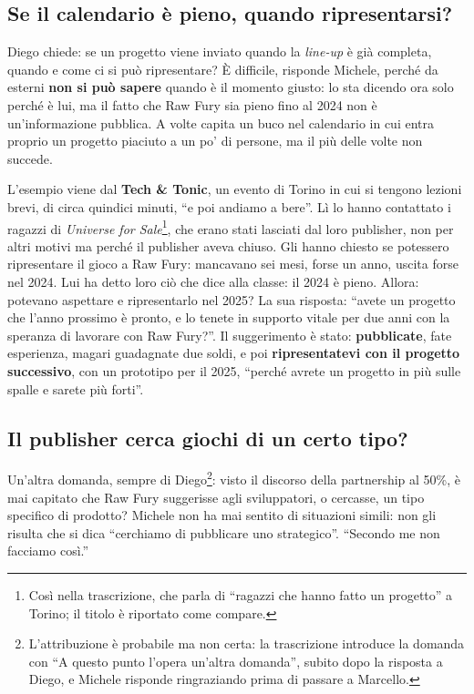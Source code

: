 \subsection{Se il calendario è pieno, quando ripresentarsi?}

Diego chiede: se un progetto viene inviato quando la \emph{line-up} è già
completa, quando e come ci si può ripresentare? È difficile, risponde Michele,
perché da esterni \textbf{non si può sapere} quando è il momento giusto: lo sta
dicendo ora solo perché è lui, ma il fatto che Raw Fury sia pieno fino al 2024
non è un'informazione pubblica. A volte capita un buco nel calendario in cui
entra proprio un progetto piaciuto a un po' di persone, ma il più delle volte non
succede.

L'esempio viene dal \textbf{Tech \& Tonic}, un evento di Torino in cui si tengono
lezioni brevi, di circa quindici minuti, ``e poi andiamo a bere''. Lì lo hanno
contattato i ragazzi di \emph{Universe for Sale}\footnote{Così nella
trascrizione, che parla di ``ragazzi che hanno fatto un progetto'' a Torino; il
titolo è riportato come compare.}, che erano stati lasciati dal loro publisher,
non per altri motivi ma perché il publisher aveva chiuso. Gli hanno chiesto se
potessero ripresentare il gioco a Raw Fury: mancavano sei mesi, forse un anno,
uscita forse nel 2024. Lui ha detto loro ciò che dice alla classe: il 2024 è
pieno. Allora: potevano aspettare e ripresentarlo nel 2025? La sua risposta:
``avete un progetto che l'anno prossimo è pronto, e lo tenete in supporto vitale
per due anni con la speranza di lavorare con Raw Fury?''. Il suggerimento è
stato: \textbf{pubblicate}, fate esperienza, magari guadagnate due soldi, e poi
\textbf{ripresentatevi con il progetto successivo}, con un prototipo per il
2025, ``perché avrete un progetto in più sulle spalle e sarete più forti''.

\subsection{Il publisher cerca giochi di un certo tipo?}

Un'altra domanda, sempre di Diego\footnote{L'attribuzione è probabile ma non
certa: la trascrizione introduce la domanda con ``A questo punto l'opera
un'altra domanda'', subito dopo la risposta a Diego, e Michele risponde
ringraziando prima di passare a Marcello.}: visto il discorso della partnership al
50\%, è mai capitato che Raw Fury suggerisse agli sviluppatori, o cercasse, un
tipo specifico di prodotto? Michele non ha mai sentito di situazioni simili:
non gli risulta che si dica ``cerchiamo di pubblicare uno strategico''.
``Secondo me non facciamo così.''

